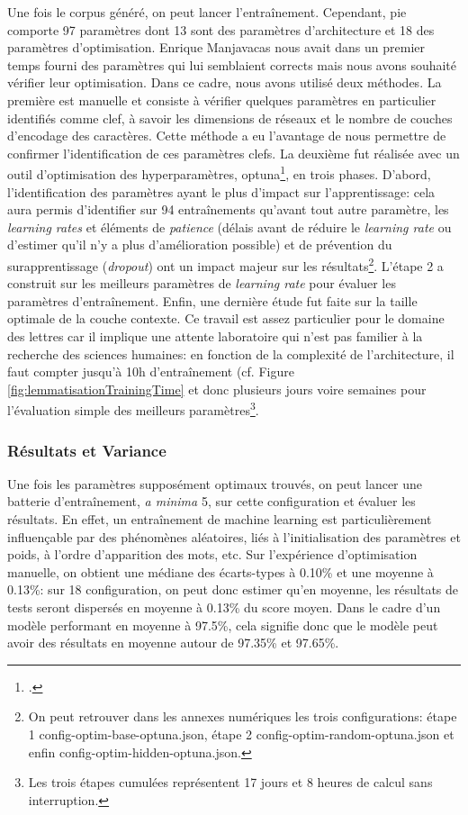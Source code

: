 Une fois le corpus généré, on peut lancer l'entraînement. Cependant, pie comporte 97 paramètres dont 13 sont des paramètres d'architecture et 18 des paramètres d'optimisation. Enrique Manjavacas nous avait dans un premier temps fourni des paramètres qui lui semblaient corrects mais nous avons souhaité vérifier leur optimisation. Dans ce cadre, nous avons utilisé deux méthodes. La première est manuelle et consiste à vérifier quelques paramètres en particulier identifiés comme clef, à savoir les dimensions de réseaux et le nombre de couches d'encodage des caractères. Cette méthode a eu l'avantage de nous permettre de confirmer l'identification de ces paramètres clefs. La deuxième fut réalisée avec un outil d'optimisation des hyperparamètres, optuna\footcite{optuna_2019}, en trois phases. D'abord, l'identification des paramètres ayant le plus d'impact sur l'apprentissage: cela aura permis d'identifier sur 94 entraînements qu'avant tout autre paramètre, les \textit{learning rates} et éléments de \textit{patience} (délais avant de réduire le \textit{learning rate} ou d'estimer qu'il n'y a plus d'amélioration possible) et de prévention du surapprentissage (\textit{dropout}) ont un impact majeur sur les résultats\footnote{On peut retrouver dans les annexes numériques les trois configurations: étape 1 config-optim-base-optuna.json, étape 2 config-optim-random-optuna.json et enfin config-optim-hidden-optuna.json.}. L'étape 2 a construit sur les meilleurs paramètres de \textit{learning rate} pour évaluer les paramètres d'entraînement. Enfin, une dernière étude fut faite sur la taille optimale de la couche contexte. Ce travail est assez particulier pour le domaine des lettres car il implique une attente laboratoire qui n'est pas familier à la recherche des sciences humaines: en fonction de la complexité de l'architecture, il faut compter jusqu'à 10h d'entraînement (cf. Figure \ref{fig:lemmatisationTrainingTime} et donc plusieurs jours voire semaines pour l'évaluation simple des meilleurs paramètres\footnote{Les trois étapes cumulées représentent 17 jours et 8 heures de calcul sans interruption.}.


\subsubsection{Résultats et Variance}

Une fois les paramètres supposément optimaux trouvés, on peut lancer une batterie d'entraînement, \textit{a minima} 5, sur cette configuration et évaluer les résultats. En effet, un entraînement de machine learning est particulièrement influençable par des phénomènes aléatoires, liés à l'initialisation des paramètres et poids, à l'ordre d'apparition des mots, etc. Sur l'expérience d'optimisation manuelle, on obtient une médiane des écarts-types à 0.10\% et une moyenne à 0.13\%: sur 18 configuration, on peut donc estimer qu'en moyenne, les résultats de tests seront dispersés en moyenne à 0.13\% du score moyen. Dans le cadre d'un modèle performant en moyenne à 97.5\%, cela signifie donc que le modèle peut avoir des résultats en moyenne autour de 97.35\% et 97.65\%.

